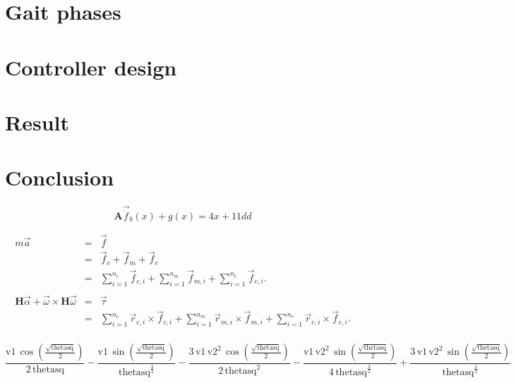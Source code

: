 \documentclass[a4paper,10pt]{article}
\begin{document}
\section{Gait phases}

\section{Controller design}


\section{Result}

\section{Conclusion}


\begin{equation}
\mathbf{A}\vec{\ddot{f}}_b(x) + g(x) = 4x + 11dd
\end{equation}

\begin{eqnarray*}
m\vec{a} & = & \vec{f} \\
         & = & \vec{f}_c+\vec{f}_m+\vec{f}_e \\
         & = & \sum_{i=1}^{n_c}{\vec{f}_{c,i}} + \sum_{i=1}^{n_m}{\vec{f}_{m,i}} + \sum_{i=1}^{n_e}{\vec{f}_{e,i}}. \\
\\
\mathbf{H}\vec\alpha + \vec\omega\times\mathbf{H}\vec\omega
         & = & \vec\tau \\
         & = & \sum_{i=1}^{n_c}{\vec{r}_{c,i}\times\vec{f}_{c,i}} + \sum_{i=1}^{n_m}{\vec{r}_{m,i}\times\vec{f}_{m,i}} + \sum_{i=1}^{n_e}{\vec{r}_{e,i}\times\vec{f}_{e,i}}. \\
\end{eqnarray*}

\begin{equation}
\frac{\mathrm{v1}\, \cos\!\left(\frac{\sqrt{\mathrm{thetasq}}}{2}\right)}{2\, \mathrm{thetasq}} - \frac{\mathrm{v1}\, \sin\!\left(\frac{\sqrt{\mathrm{thetasq}}}{2}\right)}{{\mathrm{thetasq}}^{\frac{3}{2}}} - \frac{3\, \mathrm{v1}\, {\mathrm{v2}}^2\, \cos\!\left(\frac{\sqrt{\mathrm{thetasq}}}{2}\right)}{2\, {\mathrm{thetasq}}^2} - \frac{\mathrm{v1}\, {\mathrm{v2}}^2\, \sin\!\left(\frac{\sqrt{\mathrm{thetasq}}}{2}\right)}{4\, {\mathrm{thetasq}}^{\frac{3}{2}}} + \frac{3\, \mathrm{v1}\, {\mathrm{v2}}^2\, \sin\!\left(\frac{\sqrt{\mathrm{thetasq}}}{2}\right)}{{\mathrm{thetasq}}^{\frac{5}{2}}}
\end{equation}
\end{document}
